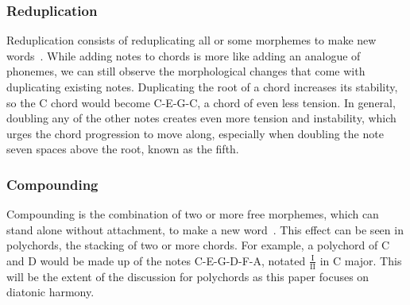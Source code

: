 \documentclass[12pt]{article}
\begin{document}
    \subsubsection*{Reduplication}
    Reduplication consists of reduplicating all or some morphemes to make new
    words~\autocite[p.~168]{dawson_phelan_2016}. While adding notes to chords
    is more like adding an analogue of phonemes, we can still observe the
    morphological changes that come with duplicating existing notes.
    Duplicating the root of a chord increases its stability, so the C chord
    would become C-E-G-C, a chord of even less tension. In general, doubling
    any of the other notes creates even more tension and instability, which
    urges the chord progression to move along, especially when doubling the
    note seven spaces above the root, known as the fifth.
    \subsubsection*{Compounding}
    Compounding is the combination of two or more free morphemes, which can
    stand alone without attachment, to make a new 
    word~\autocite[p.~166]{dawson_phelan_2016}. This effect can be seen in
    polychords, the stacking of two or more chords. For example, a polychord
    of C and D would be made up of the notes C-E-G-D-F\sh-A, notated
    \(\frac{\text{I}}{\text{II}}\) in C major. This will be the extent of the
    discussion for polychords as this paper focuses on diatonic harmony.
    \newpage
    \printbibliography
\end{document}

